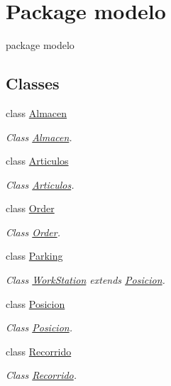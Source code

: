 \hypertarget{namespacemodelo}{}\section{Package modelo}
\label{namespacemodelo}


package modelo  


\subsection*{Classes}
\begin{DoxyCompactItemize}
\item 
class \mbox{\hyperlink{classmodelo_1_1_almacen}{Almacen}}
\begin{DoxyCompactList}\small\item\em Class \mbox{\hyperlink{classmodelo_1_1_almacen}{Almacen}}. \end{DoxyCompactList}\item 
class \mbox{\hyperlink{classmodelo_1_1_articulos}{Articulos}}
\begin{DoxyCompactList}\small\item\em Class \mbox{\hyperlink{classmodelo_1_1_articulos}{Articulos}}. \end{DoxyCompactList}\item 
class \mbox{\hyperlink{classmodelo_1_1_order}{Order}}
\begin{DoxyCompactList}\small\item\em Class \mbox{\hyperlink{classmodelo_1_1_order}{Order}}. \end{DoxyCompactList}\item 
class \mbox{\hyperlink{classmodelo_1_1_parking}{Parking}}
\begin{DoxyCompactList}\small\item\em Class \mbox{\hyperlink{classmodelo_1_1_work_station}{Work\+Station}} extends \mbox{\hyperlink{classmodelo_1_1_posicion}{Posicion}}. \end{DoxyCompactList}\item 
class \mbox{\hyperlink{classmodelo_1_1_posicion}{Posicion}}
\begin{DoxyCompactList}\small\item\em Class \mbox{\hyperlink{classmodelo_1_1_posicion}{Posicion}}. \end{DoxyCompactList}\item 
class \mbox{\hyperlink{classmodelo_1_1_recorrido}{Recorrido}}
\begin{DoxyCompactList}\small\item\em Class \mbox{\hyperlink{classmodelo_1_1_recorrido}{Recorrido}}. \end{DoxyCompactList}\item 

\end{DoxyCompactItemize}
